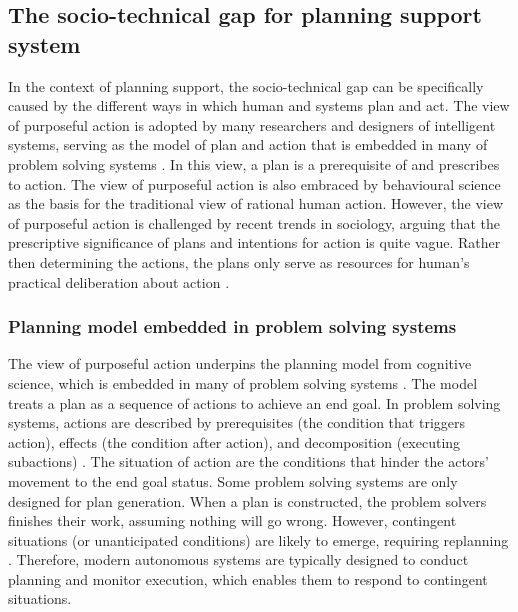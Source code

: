 \subsection{The socio-technical gap for planning support system}
In the context of planning support, the socio-technical gap can be specifically caused by the different ways in which human and systems plan and act. The view of purposeful action is adopted by many researchers and designers of intelligent systems, serving as the model of plan and action that is embedded in many of problem solving systems \citep{Allen1984}. In this view, a plan is a prerequisite of and prescribes to action. The view of purposeful action is also embraced by behavioural science as the basis for the traditional view of rational human action. However, the view of purposeful action is challenged by recent trends in sociology, arguing that the prescriptive significance of plans and intentions for action is quite vague. Rather then determining the actions, the plans only serve as resources for human's practical deliberation about action \citep{Suchman1987}.\\  

\subsubsection{Planning model embedded in problem solving systems }
The view of purposeful action underpins the planning model from cognitive science, which is embedded in many of problem solving systems \citep{Suchman1987}. The model treats a plan as a sequence of actions to achieve an end goal. In problem solving systems, actions are described by prerequisites (the condition that triggers action), effects (the condition after action), and decomposition (executing subactions) \citep{Allen1984}. The situation of action are the conditions that hinder the actors' movement to the end goal status. Some problem solving systems are only designed for plan generation. When a plan is constructed, the problem solvers finishes their work, assuming nothing will go wrong. However, contingent situations (or unanticipated conditions) are likely to emerge, requiring replanning \citep{Suchman1987}. Therefore, modern autonomous systems are typically designed to conduct planning and monitor execution, which enables them to respond to contingent situations.\\

